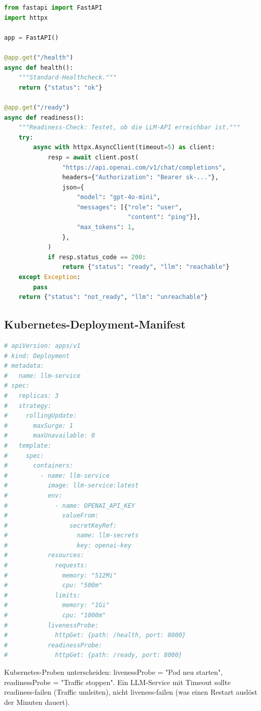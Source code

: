 \begin{lstlisting}[language=Python, caption={Health-Check mit API-Readiness}, label=lst:healthcheck]
from fastapi import FastAPI
import httpx

app = FastAPI()

@app.get("/health")
async def health():
    """Standard-Healthcheck."""
    return {"status": "ok"}

@app.get("/ready")
async def readiness():
    """Readiness-Check: Testet, ob die LLM-API erreichbar ist."""
    try:
        async with httpx.AsyncClient(timeout=5) as client:
            resp = await client.post(
                "https://api.openai.com/v1/chat/completions",
                headers={"Authorization": "Bearer sk-..."},
                json={
                    "model": "gpt-4o-mini",
                    "messages": [{"role": "user",
                                  "content": "ping"}],
                    "max_tokens": 1,
                },
            )
            if resp.status_code == 200:
                return {"status": "ready", "llm": "reachable"}
    except Exception:
        pass
    return {"status": "not_ready", "llm": "unreachable"}
\end{lstlisting}

\subsection{Kubernetes-Deployment-Manifest}

\begin{lstlisting}[language=Python, caption={Kubernetes-Deployment für LLM-Service (YAML)}]
# apiVersion: apps/v1
# kind: Deployment
# metadata:
#   name: llm-service
# spec:
#   replicas: 3
#   strategy:
#     rollingUpdate:
#       maxSurge: 1
#       maxUnavailable: 0
#   template:
#     spec:
#       containers:
#         - name: llm-service
#           image: llm-service:latest
#           env:
#             - name: OPENAI_API_KEY
#               valueFrom:
#                 secretKeyRef:
#                   name: llm-secrets
#                   key: openai-key
#           resources:
#             requests:
#               memory: "512Mi"
#               cpu: "500m"
#             limits:
#               memory: "1Gi"
#               cpu: "1000m"
#           livenessProbe:
#             httpGet: {path: /health, port: 8000}
#           readinessProbe:
#             httpGet: {path: /ready, port: 8000}
\end{lstlisting}

\begin{praxishinweis}
Kubernetes-Proben unterscheiden: livenessProbe = "Pod neu starten", readinessProbe = "Traffic stoppen". Ein LLM-Service mit Timeout sollte readiness-failen (Traffic umleiten), nicht liveness-failen (was einen Restart auslöst der Minuten dauert).
\end{praxishinweis}

